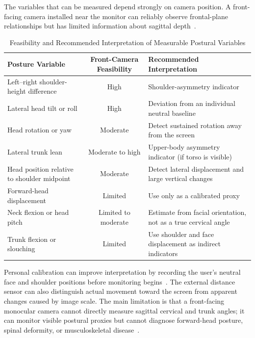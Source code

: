 The variables that can be measured depend strongly on camera position. A front-facing camera installed near the monitor can reliably observe frontal-plane relationships but has limited information about sagittal depth~\cite{ref16}.

\begin{table}[htbp]
\caption{Feasibility and Recommended Interpretation of Measurable Postural Variables}
\label{tab:posture_variables_detail}
\centering
\small
\begin{tabular}{@{}p{4.6cm}cp{5.6cm}@{}}
\toprule
\textbf{Posture Variable} & \textbf{Front-Camera Feasibility} & \textbf{Recommended Interpretation} \\
\midrule
Left--right shoulder-height difference & High & Shoulder-asymmetry indicator \\
Lateral head tilt or roll & High & Deviation from an individual neutral baseline \\
Head rotation or yaw & Moderate & Detect sustained rotation away from the screen \\
Lateral trunk lean & Moderate to high & Upper-body asymmetry indicator (if torso is visible) \\
Head position relative to shoulder midpoint & Moderate & Detect lateral displacement and large vertical changes \\
Forward-head displacement & Limited & Use only as a calibrated proxy \\
Neck flexion or head pitch & Limited to moderate & Estimate from facial orientation, not as a true cervical angle \\
Trunk flexion or slouching & Limited & Use shoulder and face displacement as indirect indicators \\
\bottomrule
\end{tabular}
\end{table}

Personal calibration can improve interpretation by recording the user's neutral face and shoulder positions before monitoring begins~\cite{ref19}. The external distance sensor can also distinguish actual movement toward the screen from apparent changes caused by image scale. The main limitation is that a front-facing monocular camera cannot directly measure sagittal cervical and trunk angles; it can monitor visible postural proxies but cannot diagnose forward-head posture, spinal deformity, or musculoskeletal disease~\cite{ref16}.

